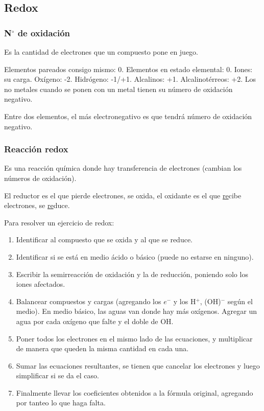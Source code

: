 \subsection{Redox}

\subsubsection*{N$^\circ$ de oxidación}

Es la cantidad de electrones que un compuesto pone en juego.

Elementos pareados consigo mismo: 0. Elementos en estado elemental: 0. Iones: su carga. Oxígeno: -2. Hidrógeno: -1/+1. Alcalinos: +1. Alcalinotérreos: +2. Los no metales cuando se ponen con un metal tienen su número de oxidación negativo.

Entre dos elementos, el más electronegativo es que tendrá número de oxidación negativo.

\subsubsection*{Reacción redox}

Es una reacción química donde hay transferencia de electrones (cambian los números de oxidación).

El reductor es el que pierde electrones, se oxida, el oxidante es el que \underline{re}cibe electrones, se \underline{re}duce.

Para resolver un ejercicio de redox:
\begin{enumerate}[itemsep=0pt, parsep=0.3em, topsep=0.3em]
    \item Identificar al compuesto que se oxida y al que se reduce.
    \item Identificar si se está en medio ácido o básico (puede no estarse en ninguno).
    \item Escribir la semirreacción de oxidación y la de reducción, poniendo solo los iones afectados.
    \item Balancear compuestos y cargas (agregando los $e^-$ y los H$^+$, (OH)$^-$ según el medio). En medio básico, las aguas van donde hay más oxígenos. Agregar un agua por cada oxígeno que falte y el doble de OH.
    \item Poner todos los electrones en el mismo lado de las ecuaciones, y multiplicar de manera que queden la misma cantidad en cada una.
    \item Sumar las ecuaciones resultantes, se tienen que cancelar los electrones y luego simplificar si se da el caso.
    \item Finalmente llevar los coeficientes obtenidos a la fórmula original, agregando por tanteo lo que haga falta.
\end{enumerate}

